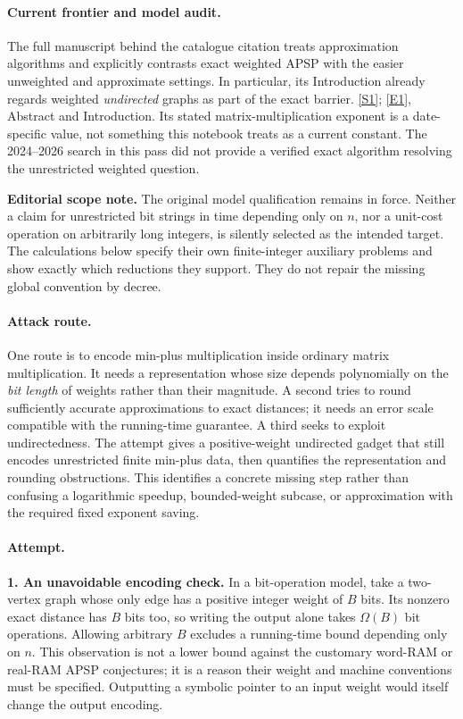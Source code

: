 \documentclass[11pt,a4paper]{article}
\newcommand{\sref}[2]{\hyperlink{source:#1:#2}{[S#2]}}
\newcommand{\eref}[2]{\hyperlink{extra:#1:#2}{[E#2]}}
\numberwithin{equation}{section}
\begin{document}
\paragraph{Current frontier and model audit.}
The full manuscript behind the catalogue citation treats approximation
algorithms and explicitly contrasts exact weighted APSP with the easier
unweighted and approximate settings. In particular, its Introduction
already regards weighted \emph{undirected} graphs as part of the exact
barrier. \sref{30006803}{1}; \eref{30006803}{1}, Abstract and Introduction.
Its stated matrix-multiplication exponent is a date-specific value, not
something this notebook treats as a current constant. The 2024--2026
search in this pass did not provide a verified exact algorithm resolving
the unrestricted weighted question.

\textbf{Editorial scope note.} The original model qualification remains
in force. Neither a claim for unrestricted bit strings in time depending
only on $n$, nor a unit-cost operation on arbitrarily long integers, is
silently selected as the intended target. The calculations below specify
their own finite-integer auxiliary problems and show exactly which
reductions they support. They do not repair the missing global convention
by decree.

\paragraph{Attack route.}
One route is to encode min-plus multiplication inside ordinary matrix
multiplication. It needs a representation whose size depends polynomially
on the \emph{bit length} of weights rather than their magnitude. A second
tries to round sufficiently accurate approximations to exact distances;
it needs an error scale compatible with the running-time guarantee. A
third seeks to exploit undirectedness. The attempt gives a positive-weight
undirected gadget that still encodes unrestricted finite min-plus data,
then quantifies the representation and rounding obstructions. This
identifies a concrete missing step rather than confusing a logarithmic
speedup, bounded-weight subcase, or approximation with the required fixed
exponent saving.

\paragraph{Attempt.}
\textbf{1. An unavoidable encoding check.}
In a bit-operation model, take a two-vertex graph whose only edge has a
positive integer weight of $B$ bits. Its nonzero exact distance has $B$
bits too, so writing the output alone takes $\Omega(B)$ bit operations.
Allowing arbitrary $B$ excludes a running-time bound depending only on
$n$. This observation is not a lower bound against the customary
word-RAM or real-RAM APSP conjectures; it is a reason their weight and
machine conventions must be specified. Outputting a symbolic pointer to
an input weight would itself change the output encoding.
\end{document}
